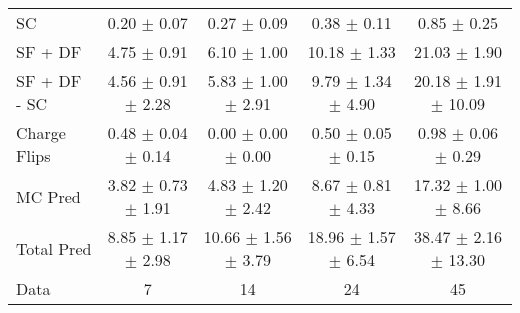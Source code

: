 \begin{tabular}{l|cccc}
                                 SC &  0.20 $\pm$  0.07 &  0.27 $\pm$  0.09 &  0.38 $\pm$  0.11 &  0.85 $\pm$  0.25 \\
                            SF + DF &  4.75 $\pm$  0.91 &  6.10 $\pm$  1.00 & 10.18 $\pm$  1.33 & 21.03 $\pm$  1.90 \\
\hline
                       SF + DF - SC &  4.56 $\pm$  0.91 $\pm$  2.28 &  5.83 $\pm$  1.00 $\pm$  2.91 &  9.79 $\pm$  1.34 $\pm$  4.90 & 20.18 $\pm$  1.91 $\pm$ 10.09 \\
\hline\hline
                       Charge Flips &  0.48 $\pm$  0.04 $\pm$  0.14 &  0.00 $\pm$  0.00 $\pm$  0.00 &  0.50 $\pm$  0.05 $\pm$  0.15 &  0.98 $\pm$  0.06 $\pm$  0.29 \\
\hline
                            MC Pred &  3.82 $\pm$  0.73 $\pm$  1.91 &  4.83 $\pm$  1.20 $\pm$  2.42 &  8.67 $\pm$  0.81 $\pm$  4.33 & 17.32 $\pm$  1.00 $\pm$  8.66 \\
\hline
                         Total Pred &  8.85 $\pm$  1.17 $\pm$  2.98 & 10.66 $\pm$  1.56 $\pm$  3.79 & 18.96 $\pm$  1.57 $\pm$  6.54 & 38.47 $\pm$  2.16 $\pm$ 13.30 \\
\hline\hline
                               Data &     7 &    14 &    24 &    45 \\
\hline\hline
\end{tabular}

